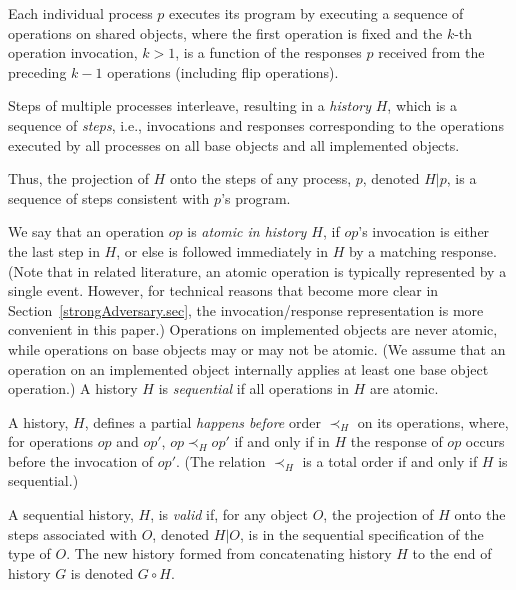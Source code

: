 \documentclass[11pt,letterpaper]{article}
\newcommand{\obj}{\ensuremath{\mathit{O}}}
\newcommand{\op}{\ensuremath{\mathit{op}}}
\begin{document}
Each individual process $p$ executes its program by executing a sequence of operations on shared objects, where the first operation is fixed and the $k$-th operation invocation, $k>1$, is a function of the responses $p$ received from the preceding $k-1$ operations (including flip operations).


Steps of multiple processes interleave, resulting in a \emph{history} $H$, which is a sequence of \emph{steps}, i.e., invocations and responses corresponding to the operations executed by all processes on all base objects and all implemented objects.

Thus, the projection of $H$ onto the steps of any process, $p$, denoted $H|p$, is a sequence of steps consistent with $p$'s program.


We say that an operation $\op$ is \emph{atomic in history $H$}, if $\op$'s invocation is either the last step in $H$, or else is followed immediately in $H$ by a matching response.
(Note that in related literature, an atomic operation is typically represented by a single event.
However, for technical reasons that become more clear in Section~\ref{strongAdversary.sec},  the invocation/response representation is more convenient in this paper.)
Operations on implemented objects are never atomic, while operations on base objects may or may not be atomic.
(We assume that an operation on an implemented object internally applies at least one base object operation.)
A history $H$ is \emph{sequential} if all operations in $H$ are atomic.

A history, $H$, defines a partial \emph{happens before} order $\prec_H$ on its operations, where, for operations $\op$ and $\op'$, $\op\prec_H \op'$ if and only if in $H$ the response of $\op$ occurs before the invocation of $\op'$.
(The relation $\prec_H$ is a total order if and only if $H$ is sequential.)


A sequential history, $H$, is \emph{valid} if, for any object \obj, the projection of $H$ onto the steps associated with \obj, denoted $H|\obj$, is in the sequential specification of the type of \obj.
The new history formed from concatenating history $H$ to the end of history $G$ is denoted $G \circ H$.
\end{document}
